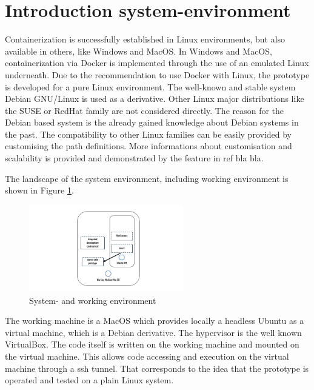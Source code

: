 \section{Introduction system-environment}
\label{ch:practical_realization:sys_env}

Containerization is successfully established in Linux environments, but also available in others, like Windows and MacOS.
In Windows and MacOS, containerization via Docker is implemented through the use of an emulated Linux underneath.
Due to the recommendation to use Docker with Linux, the prototype is developed for a pure Linux environment.
The well-known and stable system Debian GNU/Linux is used as a derivative. Other Linux major distributions like the SUSE or RedHat family are not considered directly. The reason for the Debian based system is the already gained knowledge about Debian systems in the past. The compatibility to other Linux families can be easily provided by customising the path definitions. More informations about customisation and scalability is provided and demonstrated by the feature in ref bla bla.

The landscape of the system environment, including working environment is shown in Figure \ref{fig:pract:sys_env}.
\begin{figure}[h!]
 \centering
 \includegraphics[width=0.6\textwidth]{gfx/examples/sys_env.png}
 \caption{System- and working environment}
 \label{fig:pract:sys_env}
\end{figure}
The working machine is a MacOS which provides locally a headless Ubuntu as a virtual machine, which is a Debian derivative. The hypervisor is the well known VirtualBox.
The code itself is written on the working machine and mounted on the virtual machine. This allows code accessing and execution on the virtual machine through a ssh tunnel. That corresponds to the idea that the prototype is operated and tested on a plain Linux system.

